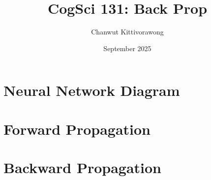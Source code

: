 \documentclass{report}
\title{CogSci 131: Back Prop}
\author{Chanwut Kittivorawong}
\date{September 2025}
\begin{document}
\maketitle

\section{Neural Network Diagram}

\section{Forward Propagation}

\section{Backward Propagation}
\end{document}
